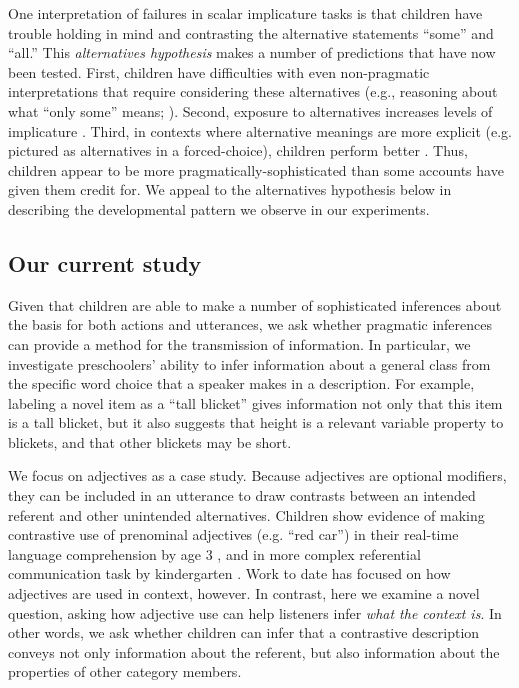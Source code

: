 \documentclass[man]{apa2}
\begin{document}
One interpretation of failures in scalar implicature tasks is that children have trouble holding in mind and contrasting the alternative statements ``some'' and ``all.'' This \emph{alternatives hypothesis} makes a number of predictions that have now been tested. First, children have difficulties with even non-pragmatic interpretations that require considering these alternatives (e.g., reasoning about what ``only some'' means; ). Second, exposure to alternatives increases levels of implicature \cite{skordos2014}. Third, in contexts where alternative meanings are more explicit (e.g. pictured as alternatives in a forced-choice), children perform better \cite{miller2005,stiller2014}. Thus, children appear to be more pragmatically-sophisticated than some accounts have given them credit for. We appeal to the alternatives hypothesis below in describing the developmental pattern we observe in our experiments. 

\subsection{Our current study}

Given that children are able to make a number of sophisticated inferences about the basis for both actions and utterances, we ask whether pragmatic inferences can provide a method for the transmission of information. In particular, we investigate preschoolers' ability to infer information about a general class from the specific word choice that a speaker makes in a description. For example, labeling a novel item as a ``tall blicket'' gives information not only that this item is a tall blicket, but it also suggests that height is a relevant variable property to blickets, and that other blickets may be short. 

We focus on adjectives as a case study.  Because adjectives are optional modifiers, they can be included in an utterance to draw contrasts between an intended referent and other unintended alternatives. 
Children show evidence of making contrastive use of prenominal adjectives (e.g. ``red car'') in their real-time language comprehension by age 3 \cite{fernald2010}, and in more complex referential communication task by kindergarten \cite{nadig2002}. Work to date has focused on how adjectives are used in context, however.  In contrast, here we examine a novel question, asking how adjective use can help listeners infer \emph{what the context is}.  In other words, we ask whether children can infer that a contrastive description conveys not only information about the referent, but also information about the properties of other category members.
\end{document}
